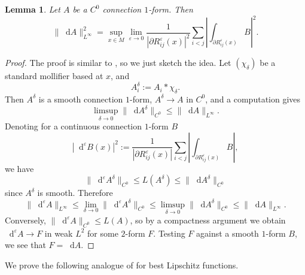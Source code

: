 \documentclass[reqno,11pt]{amsart}
\newcommand*\dif{\mathop{}\!\mathrm{d}}
\newtheorem{lemma}[theorem]{Lemma}
\theoremstyle{definition}
\numberwithin{equation}{section}
\begin{document}
\begin{lemma}
Let $A$ be a $C^0$ connection $1$-form. Then
\begin{equation}\label{dA is like Lipschitz constant}
	\|\dif A\|_{L^\infty}^2 = \sup_{x \in M} \lim_{\varepsilon \to 0} \frac{1}{|\partial R^\varepsilon_{ij}(x)|^2} \sum_{i < j} \left|\int_{\partial R^\varepsilon_{ij}(x)} B\right|^2.
\end{equation}
\end{lemma}
\begin{proof}
The proof is similar to \cite[\S5.8.2b]{evans2010partial}, so we just sketch the idea.
Let $(\chi_\delta)$ be a standard mollifier based at $x$, and
$$A^\delta_i := A_i * \chi_\delta.$$
Then $A^\delta$ is a smooth connection $1$-form, $A^\delta \to A$ in $C^0$, and a computation gives 
$$\limsup_{\delta \to 0} \|\dif A^\delta\|_{C^0} \leq \|\dif A\|_{L^\infty}.$$
Denoting for a continuous connection $1$-form $B$
$$|\dif^\varepsilon B(x)|^2 := \frac{1}{|\partial R^\varepsilon_{ij}(x)|} \sum_{i < j} \left|\int_{\partial R^\varepsilon_{ij}(x)} B\right|,$$
we have
$$\|\dif^\varepsilon A^\delta\|_{C^0} \leq L(A^\delta) \leq \|\dif A^\delta\|_{C^0}$$
since $A^\delta$ is smooth. Therefore 
$$\|\dif^\varepsilon A\|_{L^\infty} \leq \lim_{\delta \to 0} \|\dif^\varepsilon A^\delta\|_{C^0} \leq \limsup_{\delta \to 0} \|\dif A^\delta\|_{C^0} \leq \|\dif A\|_{L^\infty}.$$
Conversely, $\|\dif^\varepsilon A\|_{C^0} \leq L(A)$, so by a compactness argument we obtain $\dif^\varepsilon A \to F$ in weak $L^2$ for some $2$-form $F$.
Testing $F$ against a smooth $1$-form $B$, we see that $F = \dif A$.
\end{proof}

We prove the following analogue of \cite[Lemma 4.2]{Crandall2008} for best Lipschitz functions.
\end{document}
